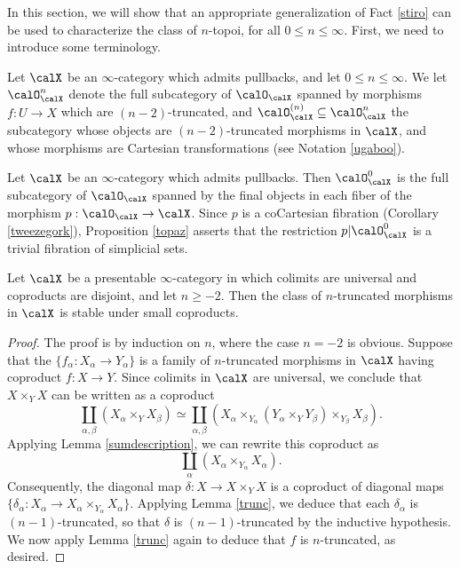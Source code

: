 In this section, we will show that an appropriate generalization of Fact \ref{stiro} can be used to characterize the class of $n$-topoi, for all $0 \leq n \leq \infty$. First, we need to introduce some terminology.

\begin{notation}\label{sumahum}
Let $\calX$ be an $\infty$-category which admits pullbacks, and let $0 \leq n \leq \infty$. We let
$\calO_{\calX}^{n}$ denote the full subcategory of $\calO_{\calX}$ spanned by morphisms
$f: U \rightarrow X$ which are $(n-2)$-truncated, and $\calO_{\calX}^{(n)} \subseteq
\calO^{n}_{\calX}$ the subcategory whose objects are $(n-2)$-truncated morphisms
in $\calX$, and whose morphisms are Cartesian transformations (see Notation
\ref{ugaboo}).
\end{notation}

\begin{example}\label{trivexa}
Let $\calX$ be an $\infty$-category which admits pullbacks. Then $\calO^{0}_{\calX}$
is the full subcategory of $\calO_{\calX}$ spanned by the final objects in each fiber of the morphism $p: \calO_{\calX} \rightarrow \calX$. Since $p$ is a coCartesian fibration (Corollary \ref{tweezegork}), Proposition \ref{topaz} asserts that the restriction $p | \calO_{\calX}^{0}$ is a trivial fibration of simplicial sets.
\end{example}

\begin{lemma}\label{nstab}
Let $\calX$ be a presentable $\infty$-category in which colimits are universal and coproducts are disjoint, and let $n \geq -2$. Then the class of $n$-truncated morphisms in $\calX$ is stable under small coproducts.
\end{lemma}

\begin{proof}
The proof is by induction on $n$, where the case $n=-2$ is obvious. Suppose that the
$\{ f_{\alpha}: X_{\alpha} \rightarrow Y_{\alpha} \}$ is a family of $n$-truncated morphisms
in $\calX$ having coproduct $f: X \rightarrow Y$. Since colimits in $\calX$ are universal, we conclude that $X \times_{Y} X$ can be written as a coproduct 
$$\coprod_{ \alpha, \beta} (X_{\alpha} \times_{Y} X_{\beta})
\simeq \coprod_{\alpha,\beta} (X_{\alpha} \times_{Y_{\alpha} } (Y_{\alpha} \times_{Y} Y_{\beta} )
\times_{Y_{\beta}} X_{\beta}). $$
Applying Lemma \ref{sumdescription}, we can rewrite this coproduct as
$$ \coprod_{\alpha} (X_{\alpha} \times_{ Y_{\alpha} } X_{\alpha}). $$
Consequently, the diagonal map $\delta: X \rightarrow X \times_{Y} X$ is a coproduct
of diagonal maps $\{ \delta_{\alpha}: X_{\alpha} \rightarrow X_{\alpha} \times_{Y_{\alpha} } X_{\alpha} \}$. Applying Lemma \ref{trunc}, we deduce that each $\delta_{\alpha}$ is $(n-1)$-truncated, so that $\delta$ is $(n-1)$-truncated by the inductive hypothesis. We now apply Lemma \ref{trunc} again to deduce that $f$ is $n$-truncated, as desired.
\end{proof}

